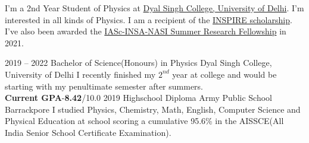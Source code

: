 \documentclass[9pt]{developercv} %
\begin{document}
\vspace{0.5cm}



\begin{minipage}[t]{0.4\textwidth} %
	\vspace{-\baselineskip} %
	
	I’m a 2nd Year Student of Physics at {\href{http://dsc.du.ac.in/}{Dyal Singh College, University of Delhi}}. I’m interested in all kinds of Physics. I am a recipient of the {\href{https://online-inspire.gov.in/}{INSPIRE scholarship}}. I’ve also been awarded the {\href{https://web-japps.ias.ac.in:8443/SEP/SummerFellowships.jsp}{IASc-INSA-NASI Summer Research Fellowship}} in 2021.
\end{minipage}
\hfill %
\begin{minipage}[t]{0.5\textwidth} %
	\vspace{-\baselineskip} %
	\begin{barchart}{5.5}
	\end{barchart}
\end{minipage}




\begin{entrylist}
	

	\entry
		{2019 -- 2022}
		{Bachelor of Science(Honours) in Physics}
		{Dyal Singh College, University of Delhi}
		{I recently finished my $2^{nd}$ year at college and would be starting with my penultimate semester after summers.\\ \textbf{Current GPA}-\textbf{8.42}/10.0}
	\entry
		{2019}
		{Highschool Diploma}
		{Army Public School Barrackpore}
		{I studied Physics, Chemistry, Math, English, Computer Science and Physical Education at school scoring a cumulative 95.6\% in the AISSCE(All India Senior School Certificate Examination).}
\end{entrylist}
\end{document}
